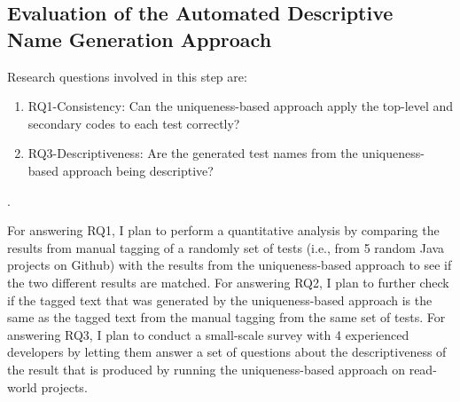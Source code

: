 \subsection{Evaluation of the Automated Descriptive Name Generation Approach}

Research questions involved in this step are:
%
\begin{enumerate}
    \item RQ1-Consistency: Can the uniqueness-based approach apply the top-level and secondary codes to each test correctly?
    \item RQ3-Descriptiveness: Are the generated test names from the uniqueness-based approach being descriptive?
\end{enumerate}.

For answering RQ1, I plan to perform a quantitative analysis by comparing the results from manual tagging of a randomly set of tests (i.e., from 5 random Java projects on Github) with the results from the uniqueness-based approach to see if the two different results are matched.
%
For answering RQ2, I plan to further check if the tagged text that was generated by the uniqueness-based approach is the same as the tagged text from the manual tagging from the same set of tests.
%
For answering RQ3, I plan to conduct a small-scale survey with 4 experienced developers by letting them answer a set of questions about the descriptiveness of the result that is produced by running the uniqueness-based approach on read-world projects.



